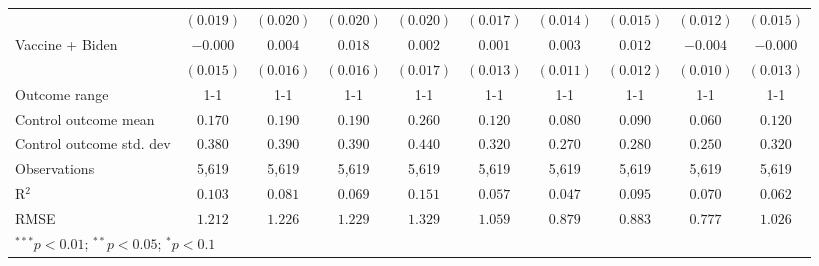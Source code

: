 \begin{table}
\begin{center}
\begin{tabular}{l c c c c c c c c c}
                              & $(0.019)$    & $(0.020)$ & $(0.020)$ & $(0.020)$    & $(0.017)$ & $(0.014)$ & $(0.015)$     & $(0.012)$ & $(0.015)$     \\
Vaccine + Biden               & $-0.000$     & $0.004$   & $0.018$   & $0.002$      & $0.001$   & $0.003$   & $0.012$       & $-0.004$  & $-0.000$      \\
                              & $(0.015)$    & $(0.016)$ & $(0.016)$ & $(0.017)$    & $(0.013)$ & $(0.011)$ & $(0.012)$     & $(0.010)$ & $(0.013)$     \\
\hline
Outcome range                 & 1-1          & 1-1       & 1-1       & 1-1          & 1-1       & 1-1       & 1-1           & 1-1       & 1-1           \\
Control outcome mean          & $0.170$      & $0.190$   & $0.190$   & $0.260$      & $0.120$   & $0.080$   & $0.090$       & $0.060$   & $0.120$       \\
Control outcome std. dev      & $0.380$      & $0.390$   & $0.390$   & $0.440$      & $0.320$   & $0.270$   & $0.280$       & $0.250$   & $0.320$       \\
Observations                  & 5,619        & 5,619     & 5,619     & 5,619        & 5,619     & 5,619     & 5,619         & 5,619     & 5,619         \\
R$^{2}$                       & $0.103$      & $0.081$   & $0.069$   & $0.151$      & $0.057$   & $0.047$   & $0.095$       & $0.070$   & $0.062$       \\
RMSE                          & $1.212$      & $1.226$   & $1.229$   & $1.329$      & $1.059$   & $0.879$   & $0.883$       & $0.777$   & $1.026$       \\
\hline
\multicolumn{10}{l}{\scriptsize{$^{***}p<0.01$; $^{**}p<0.05$; $^{*}p<0.1$}}
\end{tabular}
\caption{}
\label{table:SI_table16_reasonschange}
\end{center}
\end{table}

